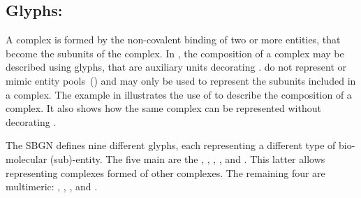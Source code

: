 

\subsection{Glyphs: }
\label{sec:subunit}

A complex is formed by the non-covalent binding of two or more entities, that become the subunits of the complex.
In \PD, the composition of a complex may be described using  glyphs, that are auxiliary units decorating .
 do not represent or mimic entity pools~() and may only be used to represent the subunits included in a complex.
The example in  illustrates the use of  to describe the composition of a complex.
It also shows how the same complex can be represented without decorating .

The SBGN \PD defines nine different  glyphs, each representing a different type of bio-molecular (sub)-entity.
The five main  are the , , , , and .
This latter  allows representing complexes formed of other complexes.
The remaining four  are multimeric: , , , and .


